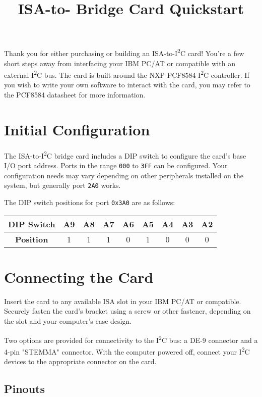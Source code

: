 \documentclass[twoside,10pt,letterpaper]{refart}
\title{\m88 ISA-to-\itwoc{} Bridge Card Quickstart}
\author{}
\date{}
\newcommand{\itwoc}{I\textsuperscript{2}C}
\begin{document}
\maketitle
\raggedright

Thank you for either purchasing or building an  ISA-to-\itwoc{} card! You're a few short steps away
from interfacing your IBM PC/AT or compatible with an external \itwoc{} bus. The card is built around
the NXP PCF8584 \itwoc{} controller. If you wish to write your own software to interact with the card,
you may refer to the PCF8584 datasheet for more information.

\section*{Initial Configuration}

The ISA-to-\itwoc{} bridge card includes a DIP switch to configure the card's base I/O port address.
Ports in the range \texttt{000} to \texttt{3FF} can be configured. Your configuration needs
may vary depending on other peripherals installed on the system, but generally port \texttt{2A0}
works.

The DIP switch positions for port \texttt{0x3A0} are as follows:

\begin{center}
    \begin{tabular}{ c|c|c|c|c|c|c|c|c }
        \textbf{DIP Switch} & A9 & A8 & A7 & A6 & A5 & A4 & A3 & A2 \\
        \hline
        \textbf{Position} & 1 & 1 & 1 & 0 & 1 & 0 & 0 & 0
    \end{tabular}
\end{center}

\section*{Connecting the Card}

Insert the card to any available ISA slot in your IBM PC/AT or compatible. Securely fasten the card's
bracket using a screw or other fastener, depending on the slot and your computer's case design.

Two options are provided for connectivity to the \itwoc{} bus: a DE-9 connector and a 4-pin "STEMMA" connector.
With the computer powered off, connect your \itwoc{} devices to the appropriate connector on the card.

\subsection*{Pinouts}
\end{document}
